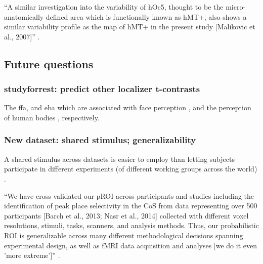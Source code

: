 ``A similar investigation into the variability of hOc5, thought to be the
micro-anatomically defined area which is functionally known as hMT+, also shows
a similar variability profile as the map of hMT+ in the present study [Malikovic
et al., 2007]'' \citep{frost2012measuring}.



\subsection{Future questions}


\subsubsection{studyforrest: predict other localizer t-contrasts}


%
The \ac{ffa}, and \ac{eba}  which are associated with face perception
\citep{kanwisher1997ffa, pitcher2011occipitalfacearea}, and the perception of
human bodies \citep{downing2001bodyarea}, respectively.


\subsubsection{New dataset: shared stimulus; generalizability}


%
A shared stimulus across datasets is easier to employ than letting subjects
participate in different experiments (of different working groups across the
world) \citep[(s.][ for an \ac{srm} based on "shared subjects acrpss
datasets]{zhang2018transfer}.

``We have cross-validated our pROI across participants and studies including the
identification of peak place selectivity in the CoS from data representing over
500 participants [Barch et al., 2013; Nasr et al., 2014] collected with
different voxel resolutions, stimuli, tasks, scanners, and analysis methods.
%
Thus, our probabilistic ROI is generalizable across many different
methodological decisions spanning experimental design, as well as fMRI data
acquisition and analyses [we do it even 'more extreme']''
\citep{weiner2018defining}.


